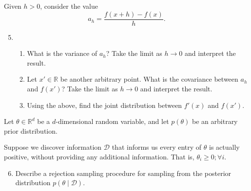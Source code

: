 \documentclass{article}
\newcommand{\given}{\mid}
\newcommand{\mc}[1]{\mathcal{#1}}
\newcommand{\data}{\mc{D}}
\newcommand{\R}{\mathbb{R}}
\begin{document}
Given $h > 0$, consider the value
\[
  a_h = \frac{f(x + h) - f(x)}{h}.
\]
\begin{enumerate}\setcounter{enumi}{4}
\item
  \begin{enumerate}
  \item
    What is the variance of $a_h$? Take the limit as $h \to 0$ and interpret the
    result.
  \item
    Let $x' \in \R$ be another arbitrary point. What is the covariance between
    $a_h$ and $f(x')$? Take the limit as $h \to 0$ and interpret the result.
  \item
    Using the above, find the joint distribution between $f'(x)$ and $f(x')$.
  \end{enumerate}
\end{enumerate}

\clearpage

Let $\theta \in \R^d$ be a $d$-dimensional random variable, and let $p(\theta)$
be an arbitrary prior distribution.

Suppose we discover information $\data$ that informs us every entry of $\theta$
is actually positive, without providing any additional information. That is,
$\theta_i \geq 0; \forall i$.
\begin{enumerate}\setcounter{enumi}{5}
\item
  Describe a rejection sampling procedure for sampling from the posterior
  distribution $p(\theta \given \data)$.
\end{enumerate}
\end{document}
